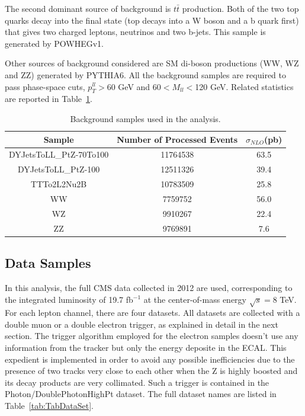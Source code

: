 The second dominant source of background is $t\bar{t}$ production. Both of the two top quarks decay into the final state (top decays into a W boson and a b quark first) that gives two charged leptons, neutrinos and two b-jets. This sample is generated by POWHEGv1\cite{POWHEG}.

Other sources of background considered are SM di-boson productions (WW, WZ and ZZ) generated by PYTHIA6. All the background samples are required to pass phase-space cuts, $p_{T}^{ll} > $60 GeV and 60$ < M_{ll} < $120 GeV. Related statistics are reported in Table~\ref{tab:TabBkgMC}.

\begin{center}
  \begin{table}[h]
    \begin{center}
      \begin{tabular}{|c|c|c|}
        \hline
        Sample & Number of Processed Events & $\sigma_{NLO}$(pb) \\ \hline
        DYJetsToLL\_PtZ-70To100 & 11764538 & 63.5 \\ \hline
        DYJetsToLL\_PtZ-100 & 12511326 & 39.4 \\ \hline
        TTTo2L2Nu2B & 10783509 & 25.8 \\ \hline
        WW & 7759752 & 56.0 \\ \hline
        WZ & 9910267 & 22.4 \\ \hline
        ZZ & 9769891 & 7.6 \\
        \hline
      \end{tabular}
    \end{center}
    \caption{\label{tab:TabBkgMC}Background samples used in the analysis.}    
  \end{table}
\end{center}

\subsection{Data Samples}
In this analysis, the full CMS data collected in 2012 are used, corresponding to the integrated luminosity of 19.7 fb$^{-1}$ at the center-of-mass energy $\sqrt{s} = $8 TeV. For each lepton channel, there are four datasets. All datasets are collected with a double muon or a double electron trigger, as explained in detail in the next section. The trigger algorithm employed for the electron samples doesn't use any information from the tracker but only the energy deposite in the ECAL. This expedient is implemented in order to avoid any possible inefficiencies due to the presence of two tracks very close to each other when the Z is highly boosted and its decay products are very collimated. Such a trigger is contained in the Photon/DoublePhotonHighPt dataset. The full dataset names are listed in Table~\ref{tab:TabDataSet}.

